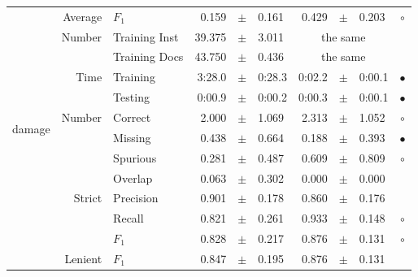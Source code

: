 \begin{longtable}{|r|r|l||rcl|rcl|c|}
\cline{2-10} &                     Average &           $F_1$ &       0.159 &  $\pm$  &       0.161 &       0.429 &  $\pm$  &       0.203 & $\circ$ \\
\cline{2-10} & \multirow{2}{*}{    Number} &   Training Inst &      39.375 &  $\pm$  &       3.011 &    \multicolumn{3}{c|}{the same}         &  \\
\cline{3-10} &                             &   Training Docs &      43.750 &  $\pm$  &       0.436 &    \multicolumn{3}{c|}{the same}         &  \\
\cline{2-10} & \multirow{2}{*}{      Time} &        Training &      3:28.0 &  $\pm$  &      0:28.3 &      0:02.2 &  $\pm$  &      0:00.1 & $\bullet$ \\
\cline{3-10} &                             &         Testing &      0:00.9 &  $\pm$  &      0:00.2 &      0:00.3 &  $\pm$  &      0:00.1 & $\bullet$ \\
\hline
\hline
\multirow{11}{*}{\begin{sideways}damage\end{sideways} }
             & \multirow{4}{*}{    Number} &         Correct &       2.000 &  $\pm$  &       1.069 &       2.313 &  $\pm$  &       1.052 & $\circ$ \\
\cline{3-10} &                             &         Missing &       0.438 &  $\pm$  &       0.664 &       0.188 &  $\pm$  &       0.393 & $\bullet$ \\
\cline{3-10} &                             &        Spurious &       0.281 &  $\pm$  &       0.487 &       0.609 &  $\pm$  &       0.809 & $\circ$ \\
\cline{3-10} &                             &         Overlap &       0.063 &  $\pm$  &       0.302 &       0.000 &  $\pm$  &       0.000 &  \\
\cline{2-10} & \multirow{3}{*}{    Strict} &       Precision &       0.901 &  $\pm$  &       0.178 &       0.860 &  $\pm$  &       0.176 &  \\
\cline{3-10} &                             &          Recall &       0.821 &  $\pm$  &       0.261 &       0.933 &  $\pm$  &       0.148 & $\circ$ \\
\cline{3-10} &                             &           $F_1$ &       0.828 &  $\pm$  &       0.217 &       0.876 &  $\pm$  &       0.131 & $\circ$ \\
\cline{2-10} &                     Lenient &           $F_1$ &       0.847 &  $\pm$  &       0.195 &       0.876 &  $\pm$  &       0.131 &  \\

\end{longtable}
